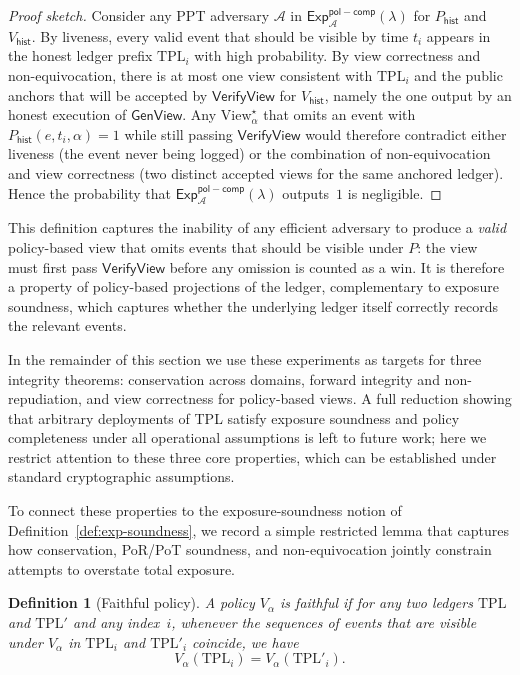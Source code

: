 \documentclass[11pt]{article}
\newtheorem{definition}{Definition}
\begin{document}
\begin{proof}[Proof sketch]
Consider any PPT adversary $\mathcal{A}$ in $\mathsf{Exp}^{\mathsf{pol-comp}}_{\mathcal{A}}(\lambda)$ for
$P_{\mathsf{hist}}$ and $V_{\mathsf{hist}}$.
By liveness, every valid event that should be visible by time $t_i$ appears in the honest ledger prefix $\mathrm{TPL}_i$
with high probability.
By view correctness and non-equivocation, there is at most one view consistent with $\mathrm{TPL}_i$ and the public
anchors that will be accepted by $\mathsf{VerifyView}$ for $V_{\mathsf{hist}}$, namely the one output by an honest
execution of $\mathsf{GenView}$.
Any $\mathrm{View}^\star_\alpha$ that omits an event with $P_{\mathsf{hist}}(e,t_i,\alpha)=1$ while still passing
$\mathsf{VerifyView}$ would therefore contradict either liveness (the event never being logged) or the combination of
non-equivocation and view correctness (two distinct accepted views for the same anchored ledger).
Hence the probability that $\mathsf{Exp}^{\mathsf{pol-comp}}_{\mathcal{A}}(\lambda)$ outputs~$1$ is negligible.
\end{proof}

This definition captures the inability of any efficient adversary to produce a \emph{valid} policy-based view that omits events that should be visible under $P$: the view must first pass $\mathsf{VerifyView}$ before any omission is counted as a win. It is therefore a property of policy-based projections of the ledger, complementary to exposure soundness, which captures whether the underlying ledger itself correctly records the relevant events.

In the remainder of this section we use these experiments as targets for three integrity theorems:
conservation across domains, forward integrity and non-repudiation, and view correctness for policy-based views.
A full reduction showing that arbitrary deployments of TPL satisfy exposure soundness and policy completeness under all
operational assumptions is left to future work; here we restrict attention to these three core properties, which can be
established under standard cryptographic assumptions.

To connect these properties to the exposure-soundness notion of Definition~\ref{def:exp-soundness},
we record a simple restricted lemma that captures how conservation, PoR/PoT soundness, and
non-equivocation jointly constrain attempts to overstate total exposure.

\begin{definition}[Faithful policy]
\label{def:faithful-policy}
A policy $V_\alpha$ is \emph{faithful} if for any two ledgers $\mathrm{TPL}$
and $\mathrm{TPL}'$ and any index~$i$,
whenever the sequences of events that are visible under $V_\alpha$ in
$\mathrm{TPL}_i$ and $\mathrm{TPL}'_i$ coincide, we have
\[
  V_\alpha(\mathrm{TPL}_i) = V_\alpha(\mathrm{TPL}'_i).
\]
\end{definition}
\end{document}
